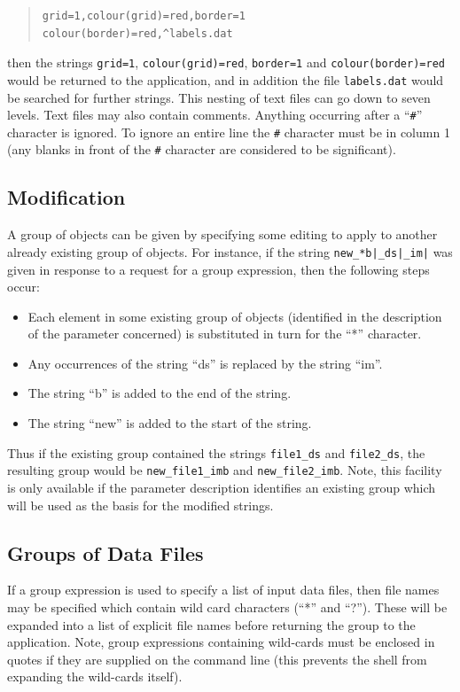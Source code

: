 \documentclass[twoside,11pt]{article}
\renewcommand{\_}{\texttt{\symbol{95}}}
\newcommand{\lsk}{\raisebox{-0.4ex}{\rm *}}
\renewcommand{\lsk}{*}
\newenvironment{myquote}{\begin{quote}\begin{small}}{\end{small}\end{quote}}
\begin{document}
\begin{myquote}
\begin{verbatim}
grid=1,colour(grid)=red,border=1
colour(border)=red,^labels.dat
\end{verbatim}
\end{myquote}

then the strings \verb+grid=1+, \verb+colour(grid)=red+, \verb+border=1+
and \verb+colour(border)=red+ would be returned to the 
application, and in addition the file \verb+labels.dat+ would be 
searched for further strings. This nesting of text files can go
down to seven levels. Text files may also contain comments. 
Anything occurring after a ``\verb+#+'' character is ignored. To ignore
an entire line the \verb+#+ character must be in column 1 (any blanks in 
front of the \verb+#+ character are considered to be significant).

\subsection{\label{SEC:MOD}Modification}
A group of objects can be given by specifying some editing to
apply to another already existing group of objects. For instance,
if the string \verb+new_*b|_ds|_im|+ was given in response to a request
for a group expression, then the following steps occur: 

\begin{itemize}
\item   Each element in some existing group of objects (identified in 
     the description of the parameter concerned) is substituted 
     in turn for the ``\lsk'' character.
\item  Any occurrences of the string ``\_ds'' is replaced by the string 
     ``\_im''.
\item  The string ``b'' is added to the end of the string.
\item  The string ``new\_'' is added to the start of the string.
\end{itemize}

Thus if the existing group contained the strings \verb+file1_ds+ and
\verb+file2_ds+, the resulting group would be \verb+new_file1_imb+
and \verb+new_file2_imb+. Note, this facility is only available if
the parameter description identifies an existing group which will be used
as the basis for the modified strings.

\subsection{Groups of Data Files}
\label{SEC:NDF}
If a group expression is used to specify a list of input data files,
then file names may be specified which contain wild card characters 
(``\lsk'' and ``?''). These  will be expanded into a list of explicit 
file names before returning the group to the application. Note,
group expressions containing wild-cards must be enclosed
in quotes if they are supplied on the command line (this prevents the shell
from expanding the wild-cards itself). 
\end{document}
